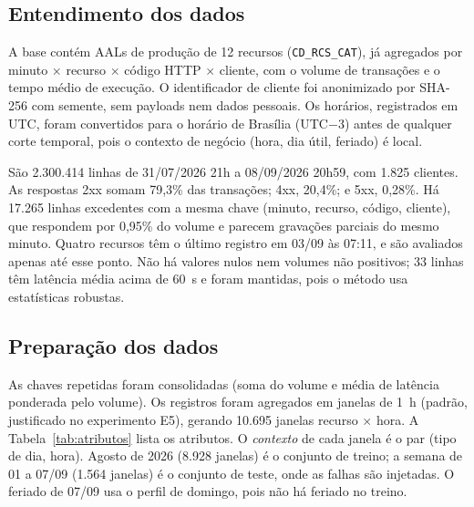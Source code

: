 \documentclass[sigconf,nonacm]{acmart}
\begin{document}
\subsection{Entendimento dos dados}
A base contém AALs de produção de 12 recursos (\texttt{CD\_RCS\_CAT}), já agregados por minuto $\times$ recurso $\times$ código HTTP $\times$ cliente, com o volume de transações e o tempo médio de execução. O identificador de cliente foi anonimizado por SHA-256 com semente, sem payloads nem dados pessoais. Os horários, registrados em UTC, foram convertidos para o horário de Brasília (UTC$-3$) antes de qualquer corte temporal, pois o contexto de negócio (hora, dia útil, feriado) é local.

São 2.300.414 linhas de 31/07/2026 21h a 08/09/2026 20h59, com 1.825 clientes. As respostas 2xx somam 79,3\% das transações; 4xx, 20,4\%; e 5xx, 0,28\%. Há 17.265 linhas excedentes com a mesma chave (minuto, recurso, código, cliente), que respondem por 0,95\% do volume e parecem gravações parciais do mesmo minuto. Quatro recursos têm o último registro em 03/09 às 07:11, e são avaliados apenas até esse ponto. Não há valores nulos nem volumes não positivos; 33 linhas têm latência média acima de 60~s e foram mantidas, pois o método usa estatísticas robustas.

\subsection{Preparação dos dados}
As chaves repetidas foram consolidadas (soma do volume e média de latência ponderada pelo volume). Os registros foram agregados em janelas de 1~h (padrão, justificado no experimento E5), gerando 10.695 janelas recurso $\times$ hora. A Tabela~\ref{tab:atributos} lista os atributos. O \emph{contexto} de cada janela é o par (tipo de dia, hora). Agosto de 2026 (8.928 janelas) é o conjunto de treino; a semana de 01 a 07/09 (1.564 janelas) é o conjunto de teste, onde as falhas são injetadas. O feriado de 07/09 usa o perfil de domingo, pois não há feriado no treino.
\end{document}
